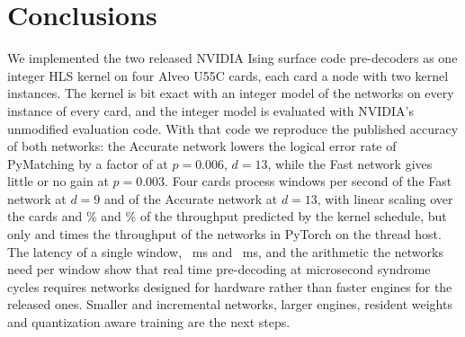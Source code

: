 \section{Conclusions}\label{sec:conclusions}

We implemented the two released NVIDIA Ising surface code pre-decoders as one integer HLS kernel on four Alveo U55C
cards, each card a node with two kernel instances. The kernel is bit exact with an integer model of the networks on
every instance of every card, and the integer model is evaluated with NVIDIA's unmodified evaluation code. With that
code we reproduce the published accuracy of both networks: the Accurate network lowers the logical error rate of
PyMatching by a factor of \NumRatioAccFpThirteenHigh{} at $p=0.006$, $d=13$, while the Fast network gives little or no
gain at $p=0.003$. Four cards process \NumFourFast{} windows per second of the Fast network at $d=9$ and \NumFourAcc{}
of the Accurate network at $d=13$, with linear scaling over the cards and \NumModelEffFast{}\% and \NumModelEffAcc{}\%
of the throughput predicted by the kernel schedule, but only \NumSpeedFast{} and \NumSpeedAcc{} times the throughput
of the networks in PyTorch on the \NumCpuThreads{} thread host. The latency of a single window, \NumLatFast{}~ms and
\NumLatAcc{}~ms, and the arithmetic the networks need per window show that real time pre-decoding at microsecond
syndrome cycles requires networks designed for hardware rather than faster engines for the released ones. Smaller and
incremental networks, larger engines, resident weights and quantization aware training are the next steps.
